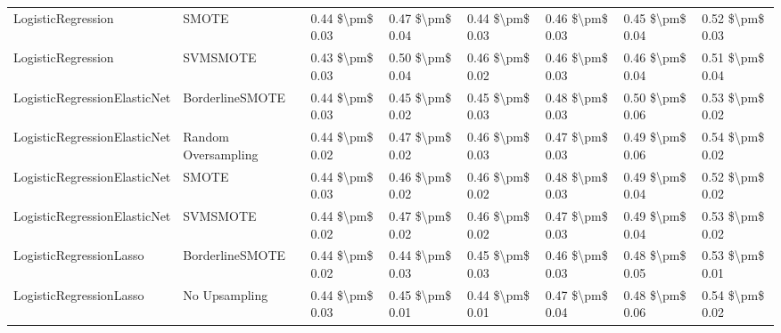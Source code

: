 \begin{tabular}{llllllll}
             LogisticRegression &                         SMOTE & 0.44 \$\textbackslash pm\$ 0.03 &           0.47 \$\textbackslash pm\$ 0.04 &       0.44 \$\textbackslash pm\$ 0.03 &        0.46 \$\textbackslash pm\$ 0.03 &                         0.45 \$\textbackslash pm\$ 0.04 &     0.52 \$\textbackslash pm\$ 0.03 \\
             LogisticRegression &                      SVMSMOTE & 0.43 \$\textbackslash pm\$ 0.03 &           0.50 \$\textbackslash pm\$ 0.04 &       0.46 \$\textbackslash pm\$ 0.02 &        0.46 \$\textbackslash pm\$ 0.03 &                         0.46 \$\textbackslash pm\$ 0.04 &     0.51 \$\textbackslash pm\$ 0.04 \\
   LogisticRegressionElasticNet &               BorderlineSMOTE & 0.44 \$\textbackslash pm\$ 0.03 &           0.45 \$\textbackslash pm\$ 0.02 &       0.45 \$\textbackslash pm\$ 0.03 &        0.48 \$\textbackslash pm\$ 0.03 &                         0.50 \$\textbackslash pm\$ 0.06 &     0.53 \$\textbackslash pm\$ 0.02 \\
   LogisticRegressionElasticNet &           Random Oversampling & 0.44 \$\textbackslash pm\$ 0.02 &           0.47 \$\textbackslash pm\$ 0.02 &       0.46 \$\textbackslash pm\$ 0.03 &        0.47 \$\textbackslash pm\$ 0.03 &                         0.49 \$\textbackslash pm\$ 0.06 &     0.54 \$\textbackslash pm\$ 0.02 \\
   LogisticRegressionElasticNet &                         SMOTE & 0.44 \$\textbackslash pm\$ 0.03 &           0.46 \$\textbackslash pm\$ 0.02 &       0.46 \$\textbackslash pm\$ 0.02 &        0.48 \$\textbackslash pm\$ 0.03 &                         0.49 \$\textbackslash pm\$ 0.04 &     0.52 \$\textbackslash pm\$ 0.02 \\
   LogisticRegressionElasticNet &                      SVMSMOTE & 0.44 \$\textbackslash pm\$ 0.02 &           0.47 \$\textbackslash pm\$ 0.02 &       0.46 \$\textbackslash pm\$ 0.02 &        0.47 \$\textbackslash pm\$ 0.03 &                         0.49 \$\textbackslash pm\$ 0.04 &     0.53 \$\textbackslash pm\$ 0.02 \\
        LogisticRegressionLasso &               BorderlineSMOTE & 0.44 \$\textbackslash pm\$ 0.02 &           0.44 \$\textbackslash pm\$ 0.03 &       0.45 \$\textbackslash pm\$ 0.03 &        0.46 \$\textbackslash pm\$ 0.03 &                         0.48 \$\textbackslash pm\$ 0.05 &     0.53 \$\textbackslash pm\$ 0.01 \\
        LogisticRegressionLasso &                 No Upsampling & 0.44 \$\textbackslash pm\$ 0.03 &           0.45 \$\textbackslash pm\$ 0.01 &       0.44 \$\textbackslash pm\$ 0.01 &        0.47 \$\textbackslash pm\$ 0.04 &                         0.48 \$\textbackslash pm\$ 0.06 &     0.54 \$\textbackslash pm\$ 0.02 \\

\end{tabular}

